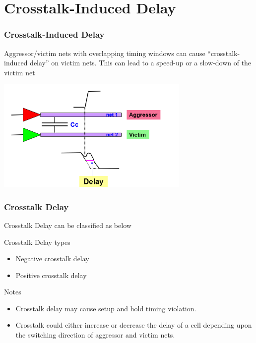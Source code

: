 \documentclass{beamer}
\begin{document}
	\section{Crosstalk-Induced Delay}
	\begin{frame}
		\frametitle{Crosstalk-Induced Delay}
			\begin{alertblock}
				
			Aggressor/victim nets with overlapping timing windows can cause “crosstalk-induced delay” on victim nets. \newline
			This can lead to a speed-up or a slow-down of the victim net
		\end{alertblock}
	\begin{center}
		\includegraphics[width=0.7\textwidth]{delay}
	\end{center}
	\end{frame}	

\begin{frame}
	\frametitle{Crosstalk Delay}
	Crosstalk Delay can be classified as below
	\begin{block}{Crosstalk Delay types}
		\begin{itemize}
			\item Negative crosstalk delay
			\item Positive crosstalk delay
		\end{itemize}
	\end{block}
	\begin{block}{Notes}
	\begin{itemize}
		\item Crosstalk delay may cause setup and hold timing violation.
		\item Crosstalk could either increase or decrease the delay of a cell depending upon the switching direction of aggressor and victim nets.
	\end{itemize}
\end{block}
\end{frame}
\end{document}
